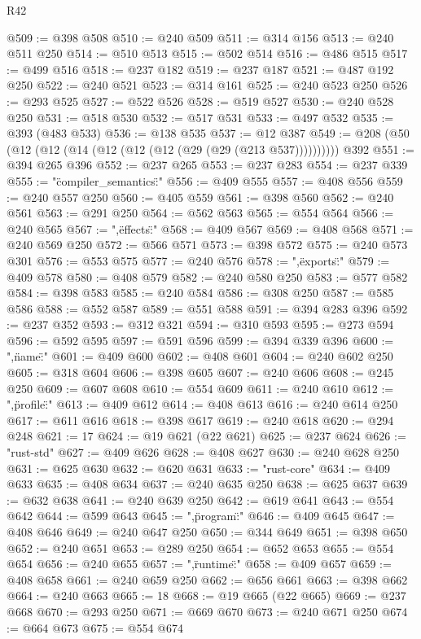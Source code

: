 \begin{lexlean}{R42}
\begin{coremodule}
@509 := @398 @508
@510 := @240 @509
@511 := @314 @156
@513 := @240 @511 @250
@514 := @510 @513
@515 := @502 @514
@516 := @486 @515
@517 := @499 @516
@518 := @237 @182
@519 := @237 @187
@521 := @487 @192 @250
@522 := @240 @521
@523 := @314 @161
@525 := @240 @523 @250
@526 := @293 @525
@527 := @522 @526
@528 := @519 @527
@530 := @240 @528 @250
@531 := @518 @530
@532 := @517 @531
@533 := @497 @532
@535 := @393 (@483 @533)
@536 := @138 @535
@537 := @12 @387
@549 := @208 (@50 (@12 (@12 (@14 (@12 (@12 (@12 (@29 (@29 (@213 @537)))))))))) @392
@551 := @394 @265 @396
@552 := @237 @265
@553 := @237 @283
@554 := @237 @339
@555 := "{\"compiler_semantics\":"
@556 := @409 @555
@557 := @408 @556
@559 := @240 @557 @250
@560 := @405 @559
@561 := @398 @560
@562 := @240 @561
@563 := @291 @250
@564 := @562 @563
@565 := @554 @564
@566 := @240 @565
@567 := ",\"effects\":"
@568 := @409 @567
@569 := @408 @568
@571 := @240 @569 @250
@572 := @566 @571
@573 := @398 @572
@575 := @240 @573 @301
@576 := @553 @575
@577 := @240 @576
@578 := ",\"exports\":"
@579 := @409 @578
@580 := @408 @579
@582 := @240 @580 @250
@583 := @577 @582
@584 := @398 @583
@585 := @240 @584
@586 := @308 @250
@587 := @585 @586
@588 := @552 @587
@589 := @551 @588
@591 := @394 @283 @396
@592 := @237 @352
@593 := @312 @321
@594 := @310 @593
@595 := @273 @594
@596 := @592 @595
@597 := @591 @596
@599 := @394 @339 @396
@600 := ",\"name\":"
@601 := @409 @600
@602 := @408 @601
@604 := @240 @602 @250
@605 := @318 @604
@606 := @398 @605
@607 := @240 @606
@608 := @245 @250
@609 := @607 @608
@610 := @554 @609
@611 := @240 @610
@612 := ",\"profile\":"
@613 := @409 @612
@614 := @408 @613
@616 := @240 @614 @250
@617 := @611 @616
@618 := @398 @617
@619 := @240 @618
@620 := @294 @248
@621 := 17
@624 := @19 @621 (@22 @621)
@625 := @237 @624
@626 := "rust-std"
@627 := @409 @626
@628 := @408 @627
@630 := @240 @628 @250
@631 := @625 @630
@632 := @620 @631
@633 := "rust-core"
@634 := @409 @633
@635 := @408 @634
@637 := @240 @635 @250
@638 := @625 @637
@639 := @632 @638
@641 := @240 @639 @250
@642 := @619 @641
@643 := @554 @642
@644 := @599 @643
@645 := ",\"program\":"
@646 := @409 @645
@647 := @408 @646
@649 := @240 @647 @250
@650 := @344 @649
@651 := @398 @650
@652 := @240 @651
@653 := @289 @250
@654 := @652 @653
@655 := @554 @654
@656 := @240 @655
@657 := ",\"runtime\":"
@658 := @409 @657
@659 := @408 @658
@661 := @240 @659 @250
@662 := @656 @661
@663 := @398 @662
@664 := @240 @663
@665 := 18
@668 := @19 @665 (@22 @665)
@669 := @237 @668
@670 := @293 @250
@671 := @669 @670
@673 := @240 @671 @250
@674 := @664 @673
@675 := @554 @674
}
\end{coremodule}
\end{lexlean}
